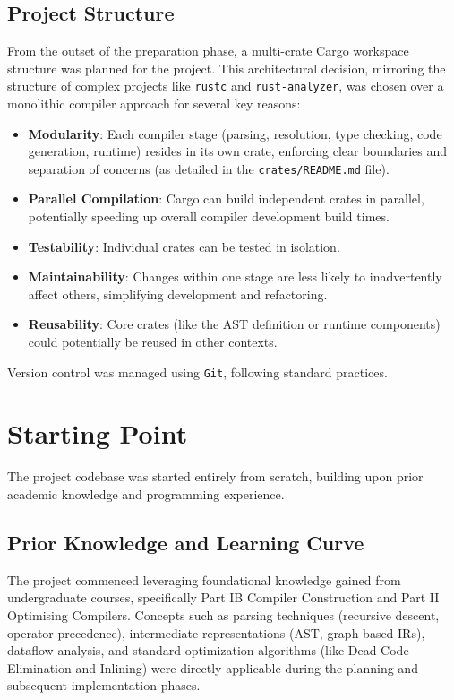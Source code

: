 \subsection{Project Structure}\label{sec:prep_project_structure}
From the outset of the preparation phase, a multi-crate Cargo workspace structure was planned for the project. This architectural decision, mirroring the structure of complex projects like \texttt{rustc} and \texttt{rust-analyzer}, was chosen over a monolithic compiler approach for several key reasons:
\begin{itemize}
    \item \textbf{Modularity}: Each compiler stage (parsing, resolution, type checking, code generation, runtime) resides in its own crate, enforcing clear boundaries and separation of concerns (as detailed in the \texttt{crates/README.md} file).
    \item \textbf{Parallel Compilation}: Cargo can build independent crates in parallel, potentially speeding up overall compiler development build times.
    \item \textbf{Testability}: Individual crates can be tested in isolation.
    \item \textbf{Maintainability}: Changes within one stage are less likely to inadvertently affect others, simplifying development and refactoring.
    \item \textbf{Reusability}: Core crates (like the AST definition or runtime components) could potentially be reused in other contexts.
\end{itemize}
Version control was managed using \texttt{Git}, following standard practices.

\section{Starting Point}\label{sec:prep_starting_point} %
The project codebase was started entirely from scratch, building upon prior academic knowledge and programming experience.

\subsection{Prior Knowledge and Learning Curve}
The project commenced leveraging foundational knowledge gained from undergraduate courses, specifically Part IB Compiler Construction and Part II Optimising Compilers. Concepts such as parsing techniques (recursive descent, operator precedence), intermediate representations (AST, graph-based IRs), dataflow analysis, and standard optimization algorithms (like Dead Code Elimination and Inlining) were directly applicable during the planning and subsequent implementation phases.

